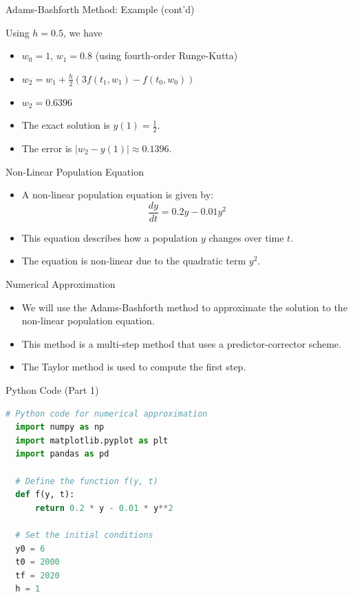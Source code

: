 \documentclass{beamer}
\begin{document}
\begin{frame}{Adams-Bashforth Method: Example (cont'd)}
    
Using $h=0.5$, we have

\begin{itemize}
    \item $w_0=1$, $w_1=0.8$ (using fourth-order Runge-Kutta)
    \item $w_2 = w_1 + \frac{h}{2}\left(3f(t_1,w_1)-f(t_0,w_0)\right)$
    \item $w_2 = 0.6396$
    \item The exact solution is $y(1)=\frac{1}{2}$.
    \item The error is $|w_2 - y(1)| \approx 0.1396$.
\end{itemize}

\end{frame}

\begin{frame}{Non-Linear Population Equation}
  \begin{itemize}
    \item A non-linear population equation is given by:
      $$\frac{dy}{dt} = 0.2y - 0.01y^2$$
    \item This equation describes how a population $y$ changes over time $t$.
    \item The equation is non-linear due to the quadratic term $y^2$.
  \end{itemize}
\end{frame}

\begin{frame}{Numerical Approximation}
  \begin{itemize}
    \item We will use the Adams-Bashforth method to approximate the solution to the non-linear population equation.
    \item This method is a multi-step method that uses a predictor-corrector scheme.
    \item The Taylor method is used to compute the first step.
  \end{itemize}
\end{frame}

\begin{frame}[fragile]{Python Code (Part 1)}
  \begin{lstlisting}[language=Python,basicstyle=\ttfamily,breaklines=true,keywordstyle=\color{blue}]
  # Python code for numerical approximation
  import numpy as np
  import matplotlib.pyplot as plt
  import pandas as pd
  
  # Define the function f(y, t)
  def f(y, t):
      return 0.2 * y - 0.01 * y**2
  
  # Set the initial conditions
  y0 = 6
  t0 = 2000
  tf = 2020
  h = 1
  \end{lstlisting}
\end{frame}
\end{document}
